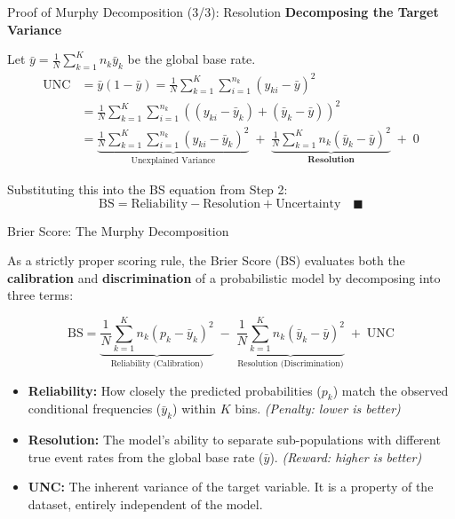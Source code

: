 \documentclass[aspectratio=169]{beamer}
\begin{document}
\begin{frame}{Proof of Murphy Decomposition (3/3): Resolution}
  \textbf{Decomposing the Target Variance}

  Let $\bar{y} = \frac{1}{N}\sum_{k=1}^K n_k \bar{y}_k$ be the global base rate. 
  \begin{align*}
    \text{UNC} &= \bar{y}(1 - \bar{y}) = \frac{1}{N} \sum_{k=1}^K \sum_{i=1}^{n_k} (y_{ki} - \bar{y})^2 \\
    &= \frac{1}{N} \sum_{k=1}^K \sum_{i=1}^{n_k} \left( (y_{ki} - \bar{y}_k) + (\bar{y}_k - \bar{y}) \right)^2 \\
    &= \underbrace{\frac{1}{N} \sum_{k=1}^K \sum_{i=1}^{n_k} (y_{ki} - \bar{y}_k)^2}_{\text{Unexplained Variance}} \;+\; \underbrace{\frac{1}{N} \sum_{k=1}^K n_k (\bar{y}_k - \bar{y})^2}_{\textbf{Resolution}} \;+\; 0
  \end{align*}
  

  Substituting this into the BS equation from Step 2:
  \[
    \text{BS} = \text{Reliability} - \text{Resolution} + \text{Uncertainty} \quad \blacksquare
  \]
\end{frame}
\begin{frame}{Brier Score: The Murphy Decomposition}

  As a strictly proper scoring rule, the Brier Score (BS) evaluates both the \textbf{calibration} and \textbf{discrimination} of a probabilistic model by decomposing into three terms:

  \vspace{0.2cm}

  \[
    \text{BS} = \underbrace{\frac{1}{N}\sum_{k=1}^K n_k (p_k - \bar{y}_k)^2}_{\text{Reliability (Calibration)}} 
    \;-\; \underbrace{\frac{1}{N}\sum_{k=1}^K n_k (\bar{y}_k - \bar{y})^2}_{\text{Resolution (Discrimination)}} 
    \;+\; \text{UNC}
  \]

  \vspace{0.3cm}

  \begin{itemize}
      \setlength{\itemsep}{0.5em}
      \item \textbf{Reliability:} How closely the predicted probabilities ($p_k$) match the observed conditional frequencies ($\bar{y}_k$) within $K$ bins. \textit{(Penalty: lower is better)}
      \item \textbf{Resolution:} The model's ability to separate sub-populations with different true event rates from the global base rate ($\bar{y}$). \textit{(Reward: higher is better)}
      \item \textbf{UNC:} The inherent variance of the target variable. It is a property of the dataset, entirely independent of the model.
  \end{itemize}

\end{frame}
\end{document}
